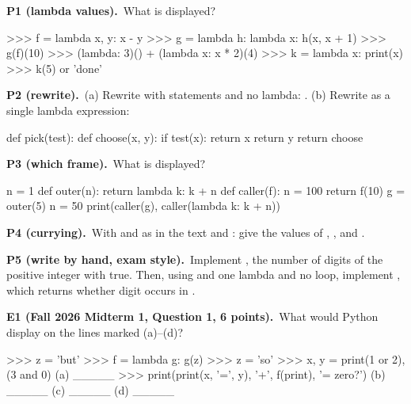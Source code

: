 \documentclass[10pt]{scrartcl}
\begin{document}
\begin{prob}\textbf{P1 (lambda values).}\ What is displayed?
\begin{py}
>>> f = lambda x, y: x - y
>>> g = lambda h: lambda x: h(x, x + 1)
>>> g(f)(10)
>>> (lambda: 3)() + (lambda x: x * 2)(4)
>>> k = lambda x: print(x)
>>> k(5) or 'done'
\end{py}
\end{prob}
\begin{prob}\textbf{P2 (rewrite).}\ (a) Rewrite with  statements and no lambda: . (b) Rewrite as a single lambda expression:
\begin{py}
def pick(test):
    def choose(x, y):
        if test(x):
            return x
        return y
    return choose
\end{py}
\end{prob}
\begin{prob}\textbf{P3 (which frame).}\ What is displayed?
\begin{py}
n = 1
def outer(n):
    return lambda k: k + n
def caller(f):
    n = 100
    return f(10)
g = outer(5)
n = 50
print(caller(g), caller(lambda k: k + n))
\end{py}
\end{prob}
\begin{prob}\textbf{P4 (currying).}\ With  and  as in the text and : give the values of , , and .
\end{prob}
\begin{prob}\textbf{P5 (write by hand, exam style).}\ Implement , the number of digits  of the positive integer  with  true. Then, using  and one lambda and no loop, implement , which returns whether digit  occurs in .
\end{prob}
\begin{prob}\textbf{E1 (Fall 2026 Midterm 1, Question 1, 6 points).}\ What would Python display on the lines marked (a)--(d)?
\begin{py}
>>> z = 'but'
>>> f = lambda g: g(z)
>>> z = 'so'
>>> x, y = print(1 or 2), (3 and 0)
(a) _____
>>> print(print(x, '=', y), '+', f(print), '= zero?')
(b) _____
(c) _____
(d) _____
\end{py}
\end{prob}
\end{document}
